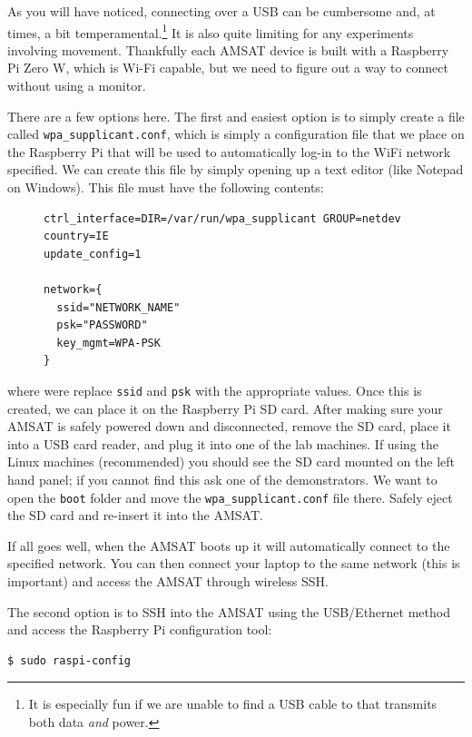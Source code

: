 \documentclass{tufte-book}
\begin{document}

As you will have noticed, connecting over a USB can be cumbersome and, at times, a bit temperamental.\footnote{It is especially fun if we are unable to find a USB cable to that transmits both data \textit{and} power.} It is also quite limiting for any experiments involving movement. Thankfully each AMSAT device is built with a Raspberry Pi Zero W, which is Wi-Fi capable, but we need to figure out a way to connect without using a monitor.

There are a few options here. The first and easiest option is to simply create a file called \texttt{wpa\_supplicant.conf}, which is simply a configuration file that we place on the Raspberry Pi that will be used to automatically log-in to the WiFi network specified. We can create this file by simply opening up a text editor (like Notepad on Windows). This file must have the following contents:

\begin{figure}
\begin{lstlisting}[backgroundcolor=\color{lightgray}]
ctrl_interface=DIR=/var/run/wpa_supplicant GROUP=netdev
country=IE
update_config=1

network={
  ssid="NETWORK_NAME"
  psk="PASSWORD"
  key_mgmt=WPA-PSK
}
\end{lstlisting}
\end{figure}

\noindent where were replace \texttt{ssid} and \texttt{psk} with the appropriate values. Once this is created, we can place it on the Raspberry Pi SD card. After making sure your AMSAT is safely powered down and disconnected, remove the SD card, place it into a USB card reader, and plug it into one of the lab machines. If using the Linux machines (recommended) you should see the SD card mounted on the left hand panel; if you cannot find this ask one of the demonstrators. We want to open the \texttt{boot} folder and move the \texttt{wpa\_supplicant.conf} file there. Safely eject the SD card and re-insert it into the AMSAT. 

If all goes well, when the AMSAT boots up it will automatically connect to the specified network. You can then connect your laptop to the same network (this is important) and access the AMSAT through wireless SSH. 

The second option is to SSH into the AMSAT using the USB/Ethernet method and access the Raspberry Pi configuration tool:

\begin{lstlisting}[backgroundcolor=\color{lightgray}]
$ sudo raspi-config
\end{lstlisting}
\end{document}
